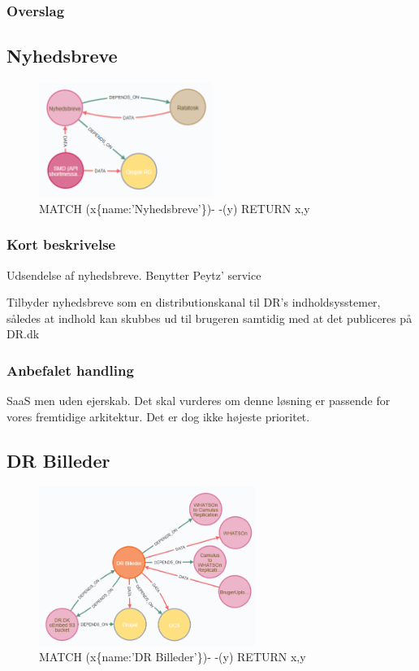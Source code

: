 \documentclass{article}
\begin{document}
\subsubsection*{Overslag}


\subsection{Nyhedsbreve}
\begin{figure}[h]
\includegraphics[width=160pt]{Nyhedsbreve.PNG}
\caption{MATCH (x\{name:'Nyhedsbreve'\})- -(y) RETURN x,y}
\end{figure}
\subsubsection*{Kort beskrivelse}
Udsendelse af nyhedsbreve. Benytter Peytz' service	

Tilbyder nyhedsbreve som en distributionskanal til DR's indholdsysstemer, således at indhold kan skubbes ud til brugeren samtidig med at det publiceres på DR.dk
\subsubsection*{Anbefalet handling}
SaaS men uden ejerskab. 
Det skal vurderes om denne løsning er passende for vores fremtidige arkitektur. Det er dog ikke højeste prioritet.



\subsection{DR Billeder}
\begin{figure}[h]
\includegraphics[width=200pt]{DRBilleder.PNG}
\caption{MATCH (x\{name:'DR Billeder'\})- -(y) RETURN x,y}
\end{figure}
\end{document}
